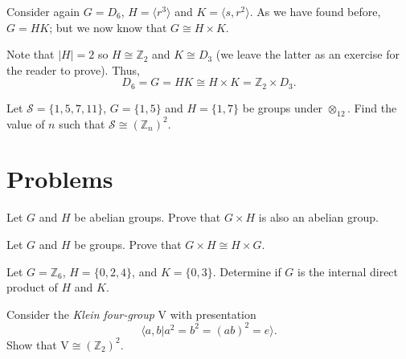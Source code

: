 \begin{example}
    Consider again $G = D_6$, $H = \langle r^3 \rangle$ and $K = \langle s, r^2 \rangle$. As we have found before, $G = HK$; but we now know that $G \cong H \times K$.

    Note that $|H| = 2$ so $H \cong \mathbb{Z}_2$ and $K \cong D_3$ (we leave the latter as an exercise for the reader to prove). Thus,
    \[
        D_6 = G = HK \cong H \times K = \mathbb{Z}_2 \times D_3.
    \]
\end{example}

\begin{exercise}
    Let $\mathcal{S} = \{1, 5, 7, 11\}$, $G = \{1, 5\}$ and $H = \{1, 7\}$ be groups under $\otimes_{12}$. Find the value of $n$ such that $\mathcal{S} \cong (\mathbb{Z}_n)^2$.
\end{exercise}

\newpage

\section{Problems}
\begin{problem}\label{problem-external-direct-product-of-abelian-groups-is-abelian}
    Let $G$ and $H$ be abelian groups. Prove that $G \times H$ is also an abelian group.
\end{problem}

\begin{problem}
    Let $G$ and $H$ be groups. Prove that $G \times H \cong H \times G$.
\end{problem}

\begin{problem}
    Let $G = \mathbb{Z}_6$, $H = \{0, 2, 4\}$, and $K = \{0, 3\}$. Determine if $G$ is the internal direct product of $H$ and $K$.
\end{problem}

\begin{problem}
    Consider the \textit{Klein four-group} $\mathrm{V}$ with presentation
    \[
        \langle a, b \vert a^2 = b^2 = (ab)^2 = e \rangle.
    \]
    Show that $\mathrm{V} \cong (\mathbb{Z}_2)^2$.
\end{problem}

